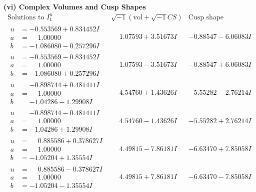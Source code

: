 \documentclass[1p]{elsarticle_modified}
\theoremstyle{definition}
\newcommand{\I}{\sqrt{-1}}
\begin{document}
\newpage\flushleft \textbf{(vi) Complex Volumes and Cusp Shapes}
$$\begin{array}{c|c|c}  
\text{Solutions to }I^u_{1}& \I (\text{vol} + \sqrt{-1}CS) & \text{Cusp shape}\\
 \hline 
\begin{aligned}
u &= -0.553569 + 0.834452 I \\
a &= \phantom{-}1.00000\phantom{ +0.000000I} \\
b &= -1.086080 - 0.257296 I\end{aligned}
 & \phantom{-}1.07593 + 3.51673 I & -0.88547 - 6.06083 I \\ \hline\begin{aligned}
u &= -0.553569 - 0.834452 I \\
a &= \phantom{-}1.00000\phantom{ +0.000000I} \\
b &= -1.086080 + 0.257296 I\end{aligned}
 & \phantom{-}1.07593 - 3.51673 I & -0.88547 + 6.06083 I \\ \hline\begin{aligned}
u &= -0.898744 + 0.481411 I \\
a &= \phantom{-}1.00000\phantom{ +0.000000I} \\
b &= -1.04286 - 1.29908 I\end{aligned}
 & \phantom{-}4.54760 + 1.43626 I & -5.55282 - 2.76214 I \\ \hline\begin{aligned}
u &= -0.898744 - 0.481411 I \\
a &= \phantom{-}1.00000\phantom{ +0.000000I} \\
b &= -1.04286 + 1.29908 I\end{aligned}
 & \phantom{-}4.54760 - 1.43626 I & -5.55282 + 2.76214 I \\ \hline\begin{aligned}
u &= \phantom{-}0.885586 + 0.378627 I \\
a &= \phantom{-}1.00000\phantom{ +0.000000I} \\
b &= -1.05204 + 1.35554 I\end{aligned}
 & \phantom{-}4.49815 - 7.86181 I & -6.63470 + 7.85058 I \\ \hline\begin{aligned}
u &= \phantom{-}0.885586 - 0.378627 I \\
a &= \phantom{-}1.00000\phantom{ +0.000000I} \\
b &= -1.05204 - 1.35554 I\end{aligned}
 & \phantom{-}4.49815 + 7.86181 I & -6.63470 - 7.85058 I \\ \hline\begin{aligned}

\end{aligned}
\end{array}$$
\end{document}
